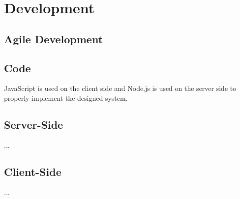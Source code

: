 \section{Development}
\label{sec:development}

\subsection{Agile Development}


\subsection{Code}

JavaScript is used on the client side and Node.js is used on the server side to properly implement the designed system.



\subsection{Server-Side}

...


\subsection{Client-Side}

...


